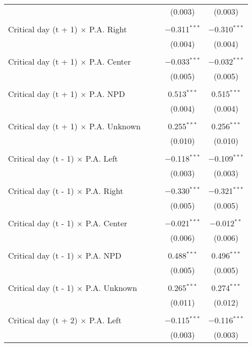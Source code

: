 \documentclass[
]{article}
\begin{document}
\begin{table}[!htbp]
{\begin{tabular}{@{\extracolsep{5pt}}lcccc}
  &  &  & (0.003) & (0.003) \\ 
  & & & & \\ 
 Critical day (t + 1) $\times$ P.A. Right &  &  & $-$0.311$^{***}$ & $-$0.310$^{***}$ \\ 
  &  &  & (0.004) & (0.004) \\ 
  & & & & \\ 
 Critical day (t + 1) $\times$ P.A. Center &  &  & $-$0.033$^{***}$ & $-$0.032$^{***}$ \\ 
  &  &  & (0.005) & (0.005) \\ 
  & & & & \\ 
 Critical day (t + 1) $\times$ P.A. NPD &  &  & 0.513$^{***}$ & 0.515$^{***}$ \\ 
  &  &  & (0.004) & (0.004) \\ 
  & & & & \\ 
 Critical day (t + 1) $\times$ P.A. Unknown &  &  & 0.255$^{***}$ & 0.256$^{***}$ \\ 
  &  &  & (0.010) & (0.010) \\ 
  & & & & \\ 
 Critical day (t - 1) $\times$ P.A. Left &  &  & $-$0.118$^{***}$ & $-$0.109$^{***}$ \\ 
  &  &  & (0.003) & (0.003) \\ 
  & & & & \\ 
 Critical day (t - 1) $\times$ P.A. Right &  &  & $-$0.330$^{***}$ & $-$0.321$^{***}$ \\ 
  &  &  & (0.005) & (0.005) \\ 
  & & & & \\ 
 Critical day (t - 1) $\times$ P.A. Center &  &  & $-$0.021$^{***}$ & $-$0.012$^{**}$ \\ 
  &  &  & (0.006) & (0.006) \\ 
  & & & & \\ 
 Critical day (t - 1) $\times$ P.A. NPD &  &  & 0.488$^{***}$ & 0.496$^{***}$ \\ 
  &  &  & (0.005) & (0.005) \\ 
  & & & & \\ 
 Critical day (t - 1) $\times$ P.A. Unknown &  &  & 0.265$^{***}$ & 0.274$^{***}$ \\ 
  &  &  & (0.011) & (0.012) \\ 
  & & & & \\ 
 Critical day (t + 2) $\times$ P.A. Left &  &  & $-$0.115$^{***}$ & $-$0.116$^{***}$ \\ 
  &  &  & (0.003) & (0.003) \\ 

\end{tabular}}
\end{table}
\end{document}

